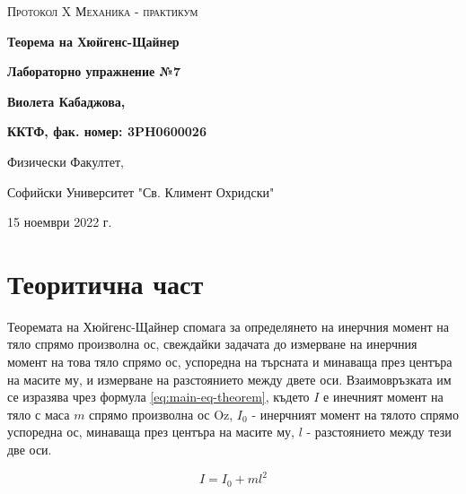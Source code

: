 \documentclass[12pt]{article}
\begin{document}
\begin{titlepage}
	\flushleft
	{\scshape\Large Протокол X \hspace{2cm} Механика - практикум\par}
	\vspace{5cm}
	{\huge\bfseries Теорема на Хюйгенс-Щайнер\par}
	\vspace{1cm}
	{\LARGE\bfseries Лабораторно упражнение №7\par}
	\vspace{5cm}
    {\LARGE\bfseries Виолета Кабаджова, \par}
    {\large\bfseries ККТФ, фак. номер: 3PH0600026\par}
	\vspace{1cm}
	
	{\large Физически Факултет, 
	
	Софийски Университет "Св. Климент Охридски"
	
	15 ноември 2022 г.\par}
	
\end{titlepage}

\section{Теоритична част}\label{sec:theoretical-part}
Теоремата на Хюйгенс-Щайнер спомага за определянето на инерчния момент на тяло спрямо произволна ос, свеждайки задачата до измерване на инерчния момент на това тяло спрямо ос, успоредна на търсната и минаваща през центъра на масите му, и измерване на разстоянието между двете оси. Взаимовръзката им се изразява чрез формула \ref{eq:main-eq-theorem}, където $I$ е инечният момент на тяло с маса $m$ спрямо произволна ос Oz, $I_0$ - инерчният момент на тялото спрямо успоредна ос, минаваща през центъра на масите му, $l$ - разстоянието между тези две оси.

\begin{equation}\label{eq:main-eq-theorem}
    I = I_0 + ml^2
\end{equation}
\end{document}
